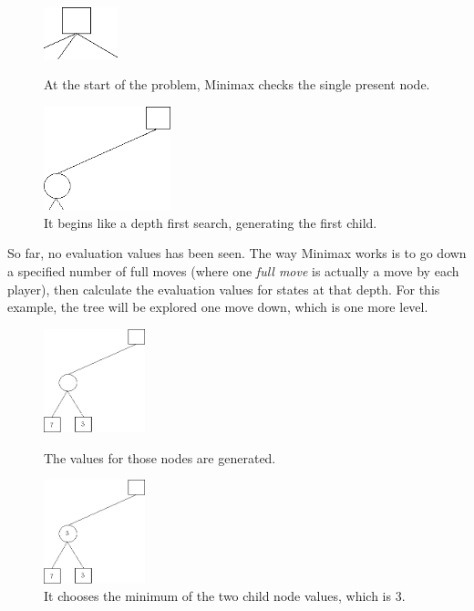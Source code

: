 \begin{figure}[H]
\centering
	\begin{minipage}[b]{0.45\linewidth}
		\centering
		\includegraphics[height=1.5cm]{2_State_of_the_art/Arimaa_on_MCTS_Benoit/img/Minimax2.png}
		\caption{\label{fig:Minimax2}At the start of the problem, Minimax checks the single present node.}
	\end{minipage}%
	\hspace*{1cm}
	\begin{minipage}[b]{0.45\linewidth}
		\centering
		\includegraphics[height=3cm]{2_State_of_the_art/Arimaa_on_MCTS_Benoit/img/Minimax3.png}
		\caption{\label{fig:Minimax3}It begins like a depth first search, generating the first child.}
	\end{minipage}%
\end{figure}

So far, no evaluation values has been seen. The way Minimax works is to go down a specified number of full moves (where one \emph{full move} is actually a move by each player), then calculate the evaluation values for states at that depth. For this example, the tree will be explored one move down, which is one more level.
\begin{figure}[H]
\centering
	\begin{minipage}[b]{0.45\linewidth}
		\centering
		\includegraphics[height=3cm]{2_State_of_the_art/Arimaa_on_MCTS_Benoit/img/Minimax4.png}
		\caption{\label{fig:Minimax4}The values for those nodes are generated.}
	\end{minipage}%
	\hspace*{1cm}
	\begin{minipage}[b]{0.45\linewidth}
		\centering
		\includegraphics[height=3cm]{2_State_of_the_art/Arimaa_on_MCTS_Benoit/img/Minimax5.png}
		\caption{\label{fig:Minimax5}It chooses the minimum of the two child node values, which is 3.}
	\end{minipage}%
\end{figure}

